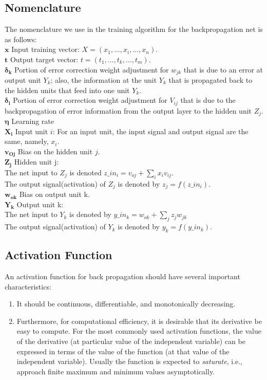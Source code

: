 \documentclass[12pt, right open]{memoir}
\begin{document}
\subsection{Nomenclature}
The nomenclature we use in the training algorithm for the backpropagation net is as follows: \\
$\mathbold{x}$ \indent Input training vector: $X = (x_1,...,x_i,...,x_n)$. \\
$\mathbold{t}$ \indent Output target vector: $t = (t_1,...,t_k,...,t_m)$. \\ 
$\mathbold{\delta_k}$ \indent Portion of error correction weight adjustment for $w_{jk}$ that is due to an error at output unit $Y_k$; also, the information at the unit $Y_k$ that is propagated back to the hidden units that feed into one unit $Y_k$. \\
$\mathbold{\delta_i}$ \indent Portion of error correction weight adjustment for $V_{ij}$ that is due to the backpropagation of error information from the output layer to the hidden unit $Z_j$. \\
$\mathbold{\eta}$ \indent Learning rate \\
$\mathbold{X_i}$ \indent Input unit $i$: For an input unit, the input signal and output signal are the same, namely, $x_i$. \\
$\mathbold{v_{Oj}}$ \indent Bias on the hidden unit $j$. \\
$\mathbold{Z_j}$ \indent Hidden unit j: \\
\indent \indent The net input to $Z_j$ is denoted $z\_in_i = v_{oj} + \sum_i x_i v_{ij} $. \\
\indent \indent The output signal(activation) of $Z_j$ is denoted by $z_j = f(z\_in_i)$. \\
$\mathbold{w_{ok}}$ Bias on output unit k. \\
$\mathbold{Y_k}$ Output unit k: \\
\indent \indent The net input to $Y_k$ is denoted by $y\_in_k = w_{ok} + \sum_j z_j w_{jk}$ \\
\indent \indent The output signal(activation) of $Y_k$ is denoted by $y_k = f(y\_in_k)$. \\


\subsection{Activation Function}
An activation function for back propagation should have several important characteristics: 
\begin{enumerate}
\item It should be continuous, differentiable, and monotonically decreasing.
\item Furthermore, for computational efficiency, it is desirable that its derivative be easy to compute. 
For the most commonly used activation functions, the value of the derivative (at particular value of the independent variable) can be expressed in terms of the value of the function (at that value of the independent variable). Usually the function is expected to \textit{saturate}, i.e., approach finite maximum and minimum values asymptotically.
\end{enumerate}
\end{document}
